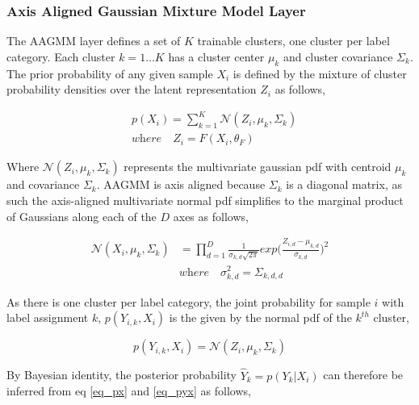 \documentclass[10pt,twocolumn,letterpaper]{article}
\begin{document}
\subsubsection{Axis Aligned Gaussian Mixture Model Layer}

The AAGMM layer defines a set of $K$ trainable clusters, one cluster per label category. 
Each cluster $k=1 \dots K$ has a cluster center $\mu_k$ and cluster covariance $\Sigma_k$. 
The prior probability of any given sample $X_i$ is defined by the mixture of cluster probability densities over the latent representation $Z_i$ as follows,

\begin{equation}
	\begin{aligned}
		\label{eq_px}
		&p(X_i) = \sum_{k=1}^K \mathcal{N} (Z_i, \mu_{k}, \Sigma_k)
		\\[10pt]
		&\textit{where} \quad Z_i = F(X_i, \theta_F)
	\end{aligned}
\end{equation}

Where $\mathcal{N}(Z_i, \mu_k, \Sigma_k)$ represents the multivariate gaussian pdf with centroid $\mu_k$ and covariance $\Sigma_k$. 
AAGMM is axis aligned because $\Sigma_k$ is a diagonal matrix, as such the axis-aligned multivariate normal pdf simplifies to the marginal product of Gaussians along each of the $D$ axes as follows,

\begin{equation}
	\begin{aligned}
		\mathcal{N} (X_i, \mu_{k}, \Sigma_k) &=  \prod_{d=1}^D \frac{1}{\sigma_{k,d}\sqrt{2 \pi}} exp \Big( \frac{Z_{i,d} - \mu_{k,d}} {\sigma_{k,d}} \Big)^2 \\[10pt]
		&\textit{where} \quad \sigma^2_{k,d} = \Sigma_{k,d,d}
	\end{aligned}
\end{equation}

As there is one cluster per label category, the joint probability for sample $i$ with label assignment $k$, $p(Y_{i,k},X_i)$ is the given by the normal pdf of the $k^{th}$ cluster,

\begin{equation}
	\label{eq_pyx}
	p(Y_{i,k},X_i) = \mathcal{N} (Z_i, \mu_{k}, \Sigma_k) \end{equation}

By Bayesian identity, the posterior probability $\hat{Y}_k=p(Y_{k}|X_i)$ can therefore be inferred from eq \ref{eq_px} and \ref{eq_pyx} as follows,
\end{document}
